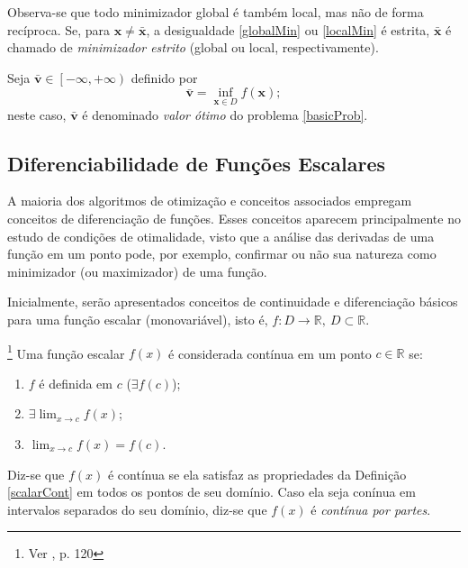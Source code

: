 Observa-se que todo minimizador global \'{e} tamb\'{e}m local, mas n\~{a}o de forma rec\'{i}proca. Se, para $\mathbf{x} \ne \bar{\mathbf{x}}$, a desigualdade \eqref{globalMin} ou \eqref{localMin} \'{e} estrita, $\bar{\mathbf{x}}$ \'{e} chamado de \textit{minimizador estrito} (global ou local, respectivamente).

\begin{definition} 
Seja $\bar{\mathbf{v}} \in \left[ -\infty,+\infty \right)$ definido por
\begin{equation}
\bar{\mathbf{v}} = \inf_{\mathbf{x} \in D} f(\mathbf{x});
\end{equation}
neste caso, $\bar{\mathbf{v}}$ \'{e} denominado \textit{valor \'{o}timo} do problema \eqref{basicProb}.
\end{definition} 

\subsection{Diferenciabilidade de Fun\c{c}\~{o}es Escalares}

A maioria dos algoritmos de otimiza\c{c}\~{a}o e conceitos associados empregam conceitos de diferencia\c{c}\~{a}o de fun\c{c}\~{o}es. Esses conceitos aparecem principalmente no estudo de condi\c{c}\~{o}es de otimalidade, visto que a an\'{a}lise das derivadas de uma fun\c{c}\~{a}o em um ponto pode, por exemplo, confirmar ou n\~{a}o sua natureza como minimizador (ou maximizador) de uma fun\c{c}\~{a}o.

Inicialmente, ser\~{a}o apresentados conceitos de continuidade e diferencia\c{c}\~{a}o b\'{a}sicos para uma fun\c{c}\~{a}o escalar (monovari\'{a}vel), isto \'{e}, $f: D \to \mathbb{R},~D \subset \mathbb{R}$.

\begin{definition}\footnote{Ver \cite{thomas1}, p. 120} \label {scalarCont} 
Uma fun\c{c}\~{a}o escalar $f(x)$ \'{e} considerada cont\'{i}nua em um ponto $c \in \mathbb{R}$ se:
\begin{enumerate}[label=(\alph*)]
\item $f$ \'{e} definida em $c$ ($\exists f(c)$);
\item $\exists \lim_{x \to c} f(x)$;
\item $\lim_{x \to c} f(x) = f(c)$.
\end{enumerate}
\end{definition}

Diz-se que $f(x)$ \'{e} cont\'{i}nua se ela satisfaz as propriedades da Defini\c{c}\~{a}o \ref{scalarCont} em todos os pontos de seu dom\'{i}nio. Caso ela seja con\'{i}nua em intervalos separados do seu dom\'{i}nio, diz-se que $f(x)$ \'{e} \textit{cont\'{i}nua por partes}.

